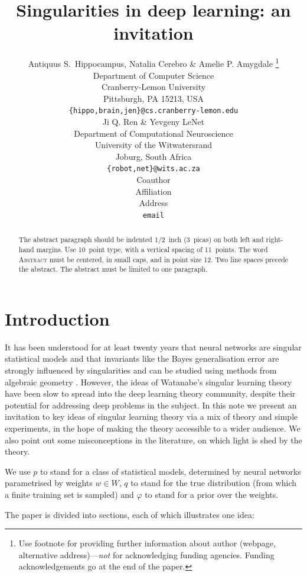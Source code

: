 \documentclass{article} %
\title{Singularities in deep learning: an invitation}
\author{Antiquus S.~Hippocampus, Natalia Cerebro \& Amelie P. Amygdale \thanks{ Use footnote for providing further information
about author (webpage, alternative address)---\emph{not} for acknowledging
funding agencies.  Funding acknowledgements go at the end of the paper.} \\
Department of Computer Science\\
Cranberry-Lemon University\\
Pittsburgh, PA 15213, USA \\
\texttt{\{hippo,brain,jen\}@cs.cranberry-lemon.edu} \\
\And
Ji Q. Ren \& Yevgeny LeNet \\
Department of Computational Neuroscience \\
University of the Witwatersrand \\
Joburg, South Africa \\
\texttt{\{robot,net\}@wits.ac.za} \\
\AND
Coauthor \\
Affiliation \\
Address \\
\texttt{email}
}
\begin{document}
\maketitle

\begin{abstract}
The abstract paragraph should be indented 1/2~inch (3~picas) on both left and
right-hand margins. Use 10~point type, with a vertical spacing of 11~points.
The word \textsc{Abstract} must be centered, in small caps, and in point size 12. Two
line spaces precede the abstract. The abstract must be limited to one
paragraph.
\end{abstract}

\section{Introduction}

It has been understood for at least twenty years that neural networks are singular statistical models \cite{??} and that invariants like the Bayes generalisation error are strongly influenced by singularities and can be studied using methods from algebraic geometry \cite{??}. However, the ideas of Watanabe's singular learning theory \citep{watanabe_algebraic_2009} have been slow to spread into the deep learning theory community, despite their potential for addressing deep problems in the subject. In this note we present an invitation to key ideas of singular learning theory via a mix of theory and simple experiments, in the hope of making the theory accessible to a wider audience. We also point out some misconceptions in the literature, on which light is shed by the theory.

We use $p$ to stand for a class of statistical models, determined by neural networks parametrised by weights $w \in W$, $q$ to stand for the true distribution (from which a finite training set is sampled) and $\varphi$ to stand for a prior over the weights.

The paper is divided into sections, each of which illustrates one idea:
\end{document}
